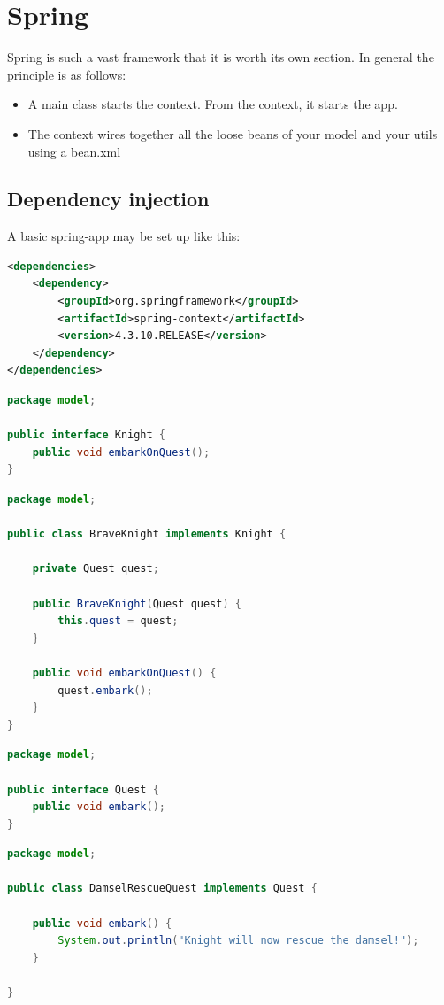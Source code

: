 \section{Spring}

Spring is such a vast framework that it is worth its own section. 
In general the principle is as follows:

\begin{itemize}
    \item A main class starts the context. From the context, it starts the app.
    \item The context wires together all the loose beans of your model and your utils using a bean.xml
\end{itemize}

\subsection{Dependency injection}

A basic spring-app may be set up like this: 

\begin{lstlisting}[language=xml]
<dependencies>
	<dependency>
		<groupId>org.springframework</groupId>
		<artifactId>spring-context</artifactId>
		<version>4.3.10.RELEASE</version>
	</dependency>
</dependencies>
\end{lstlisting}

\begin{lstlisting}[language=java]
package model;

public interface Knight {
	public void embarkOnQuest();
}
\end{lstlisting}


\begin{lstlisting}[language=java]
package model;

public class BraveKnight implements Knight {

	private Quest quest;
	
	public BraveKnight(Quest quest) {
		this.quest = quest;
	}

	public void embarkOnQuest() {
		quest.embark();
	}
}
\end{lstlisting}


\begin{lstlisting}[language=java]
package model;

public interface Quest {
	public void embark();
}

\end{lstlisting}

\begin{lstlisting}[language=java]
package model;

public class DamselRescueQuest implements Quest {

	public void embark() {
		System.out.println("Knight will now rescue the damsel!");
	}

}
\end{lstlisting}


